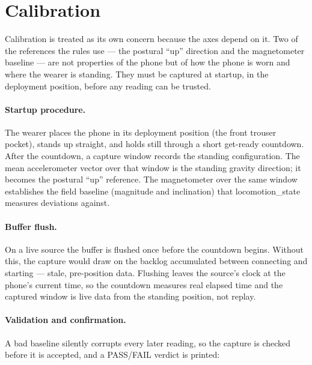 \documentclass[11pt]{article}
\newcommand{\axis}[1]{\textsf{#1}}          %
\begin{document}
\section{Calibration}
\label{sec:calibration}

Calibration is treated as its own concern because the axes depend on it. Two of the
references the rules use --- the postural ``up'' direction and the magnetometer baseline
--- are not properties of the phone but of how the phone is worn and where the wearer
is standing. They must be captured at startup, in the deployment position, before any
reading can be trusted.

\paragraph{Startup procedure.}
The wearer places the phone in its deployment position (the front trouser pocket),
stands up straight, and holds still through a short get-ready countdown. After the
countdown, a capture window records the standing configuration. The mean accelerometer
vector over that window is the standing gravity direction; it becomes the postural
``up'' reference. The magnetometer over the same window establishes the field
baseline (magnitude and inclination) that \axis{locomotion\_state} measures deviations
against.

\paragraph{Buffer flush.}
On a live source the buffer is flushed once before the countdown begins. Without this,
the capture would draw on the backlog accumulated between connecting and starting ---
stale, pre-position data. Flushing leaves the source's clock at the phone's current
time, so the countdown measures real elapsed time and the captured window is live data
from the standing position, not replay.

\paragraph{Validation and confirmation.}
A bad baseline silently corrupts every later reading, so the capture is checked before
it is accepted, and a PASS/FAIL verdict is printed:
\end{document}
